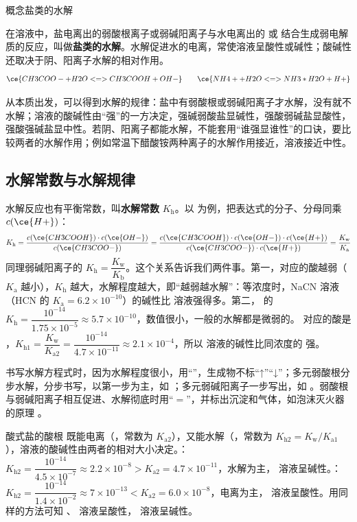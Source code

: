 \documentclass[UTF8,a4paper,zihao=5,oneside,openany,fontset=none]{ctexbook}
\def\heiti{\CJKfamily{zhhei}}
\newcommand{\textheading}[2]{\par\addvspace{.6em}\Needspace{4\baselineskip}\noindent
 {\heiti\if\relax\detokenize{#2}\relax #1\else #2\fi}\par\nobreak\smallskip\nobreak\color{black}\ignorespaces}
\newenvironment{gainian}[1][]{\textheading{概念}{#1}}{\par\smallskip}
\begin{document}
\begin{gainian}[盐类的水解]
在溶液中，盐电离出的弱酸根离子或弱碱阳离子与水电离出的  或  结合生成弱电解质的反应，叫做\textbf{盐类的水解}。水解促进水的电离，常使溶液呈酸性或碱性；酸碱性还取决于阴、阳离子水解的相对作用。
\[\ce{CH3COO- + H2O <=> CH3COOH + OH-}\qquad \ce{NH4+ + H2O <=> NH3*H2O + H+}\]
\end{gainian}

从本质出发，可以得到水解的规律：盐中有弱酸根或弱碱阳离子才水解，没有就不水解；溶液的酸碱性由“强”的一方决定，强碱弱酸盐显碱性，强酸弱碱盐显酸性，强酸强碱盐显中性。若阴、阳离子都能水解，不能套用“谁强显谁性”的口诀，要比较两者的水解作用；例如常温下醋酸铵两种离子的水解作用接近，溶液接近中性。

\subsection{水解常数与水解规律}
水解反应也有平衡常数，叫\textbf{水解常数} $K_\text{h}$。以  为例，把表达式的分子、分母同乘 $c(\ce{H+})$：
\[K_\text{h}=\frac{c(\ce{CH3COOH})\cdot c(\ce{OH-})}{c(\ce{CH3COO-})}=\frac{c(\ce{CH3COOH})\cdot c(\ce{OH-})\cdot c(\ce{H+})}{c(\ce{CH3COO-})\cdot c(\ce{H+})}=\frac{K_\text{w}}{K_\text{a}}\]
同理弱碱阳离子的 $K_\text{h}=\dfrac{K_\text{w}}{K_\text{b}}$。这个关系告诉我们两件事。第一，对应的酸越弱（$K_\text{a}$ 越小），$K_\text{h}$ 越大，水解程度越大，即“越弱越水解”：等浓度时，NaCN 溶液（HCN 的 $K_\text{a}=6.2\times10^{-10}$）的碱性比  溶液强得多。第二， 的 $K_\text{h}=\dfrac{10^{-14}}{1.75\times10^{-5}}\approx5.7\times10^{-10}$，数值很小，一般的水解都是微弱的。 对应的酸是 ，$K_\text{h1}=\dfrac{K_\text{w}}{K_{\text{a}2}}=\dfrac{10^{-14}}{4.7\times10^{-11}}\approx2.1\times10^{-4}$，所以  溶液的碱性比同浓度的  强。

书写水解方程式时，因为水解程度很小，用“\ce{<=>}”，生成物不标“↑”“↓”；多元弱酸根分步水解，分步书写，以第一步为主，如 ；多元弱碱阳离子一步写出，如 。弱酸根与弱碱阳离子相互促进、水解彻底时用“$=$”，并标出沉淀和气体，如泡沫灭火器的原理 。

酸式盐的酸根  既能电离（，常数为 $K_{\text{a}2}$），又能水解（，常数为 $K_\text{h2}=K_\text{w}/K_{\text{a}1}$），溶液的酸碱性由两者的相对大小决定。：$K_\text{h2}=\dfrac{10^{-14}}{4.5\times10^{-7}}\approx2.2\times10^{-8}>K_{\text{a}2}=4.7\times10^{-11}$，水解为主， 溶液呈碱性。：$K_\text{h2}=\dfrac{10^{-14}}{1.4\times10^{-2}}\approx7\times10^{-13}<K_{\text{a}2}=6.0\times10^{-8}$，电离为主， 溶液呈酸性。用同样的方法可知 、 溶液呈酸性， 溶液呈碱性。
\end{document}
